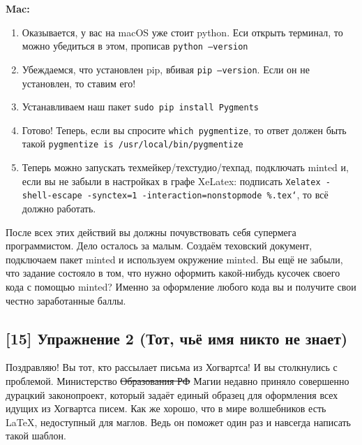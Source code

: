 \documentclass[12pt, a4paper, oneside]{article}
\begin{document}
\textbf{Mac:}

\begin{enumerate}
\item Оказывается, у вас на macOS уже стоит python. Еси открыть терминал, то можно убедиться в этом, прописав \texttt{python --version}
\item Убеждаемся, что установлен pip, вбивая  \texttt{pip --version}. Если он не установлен, то ставим его!  
\item Устанавливаем наш пакет  \texttt{sudo pip install Pygments}
\item  Готово! Теперь, если вы спросите \texttt{which pygmentize}, то  ответ должен быть такой  \texttt{pygmentize is /usr/local/bin/pygmentize}
\item Теперь можно запускать техмейкер/техстудио/техпад, подключать minted и, если вы не забыли в настройках  в графе  XeLatex:  подписать  \texttt{Xelatex -shell-escape -synctex=1 -interaction=nonstopmode \%.tex`}, то всё должно работать.
\end{enumerate} 


После всех этих действий вы должны почувствовать себя супермега программистом. Дело осталось за малым. Создаём теховский документ, подключаем пакет minted и используем окружение minted. Вы ещё не забыли, что задание состояло в том, что нужно оформить какой-нибудь кусочек своего кода с помощью minted? Именно за оформление любого кода вы и получите свои честно заработанные баллы. 



\subsection*{[15]   Упражнение 2 (Тот, чьё имя никто не знает)}

Поздравляю! Вы тот, кто рассылает письма из Хогвартса! И вы столкнулись с проблемой. Министерство \sout{Образования РФ}  Магии недавно приняло совершенно дурацкий законопроект, который задаёт единый образец для оформления всех идущих из Хогвартса писем. Как же хорошо, что в мире волшебников есть \LaTeX{}, недоступный для маглов. Ведь он поможет один раз и навсегда написать такой шаблон. 
\end{document}
